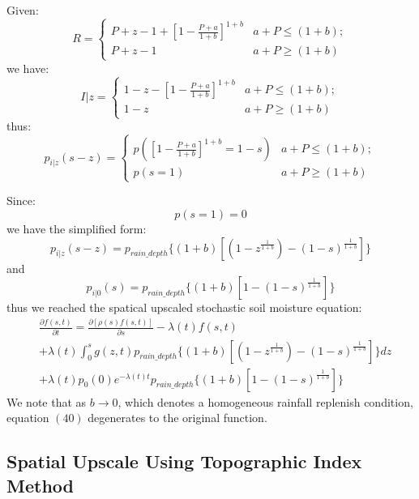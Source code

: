 \documentclass[11pt]{article}
\begin{document}
Given:
\begin{equation}
R=
 \begin{cases}
 P+z-1+[1-\frac{P+a}{1+b}]^{1+b}&{a+P\leq (1+b)};\\P+z-1 &{a+P\geq (1+b)}
 \end{cases}
\end{equation}
we have:
\begin{equation}
I\vert z=
 \begin{cases}
 1-z-[1-\frac{P+a}{1+b}]^{1+b}&{a+P\leq (1+b)};\\1-z &{a+P\geq (1+b)}
 \end{cases}
\end{equation}
thus:
\begin{equation}
p_{i|z}(s-z)=
 \begin{cases}
 p([1-\frac{P+a}{1+b}]^{1+b}=1-s)&{a+P\leq (1+b)};\\p(s=1) &{a+P\geq (1+b)}
 \end{cases}
\end{equation}

Since:
\begin{equation}
p(s=1)=0
\end{equation}
we have the simplified form:
\begin{equation}
p_{i|z}(s-z)=p_{rain\_depth} \lbrace(1+b)[(1-z^{\frac{1}{1+b}})-(1-s)^{\frac{1}{1+b}}]\rbrace
\end{equation}
and
\begin{equation}
p_{i|0}(s)=p_{rain\_depth} \lbrace(1+b)[1-(1-s)^{\frac{1}{1+b}}]\rbrace
\end{equation}
thus we reached the spatical upscaled stochastic soil moisture equation:
 \begin{equation}
 \begin{split}
 &\frac{\partial{f(s,t)}}{\partial t}=\frac{\partial{[\rho(s)f(s,t)]}}{\partial s}-\lambda(t)f(s,t)\\&+\lambda(t)\int_{0}^{s} g(z,t)p_{rain\_depth} \lbrace(1+b)[(1-z^{\frac{1}{1+b}})-(1-s)^{\frac{1}{1+b}}]\rbrace dz\\&+\lambda(t)p_0(0)e^{-\lambda(t) t}p_{rain\_depth} \lbrace(1+b)[1-(1-s)^{\frac{1}{1+b}}]\rbrace
 \end{split}
 \end{equation}
We note that as $b\rightarrow0$, which denotes a homogeneous rainfall replenish condition, equation $(40)$ degenerates to the original function.

\subsection{Spatial Upscale Using Topographic Index Method}
\end{document}

